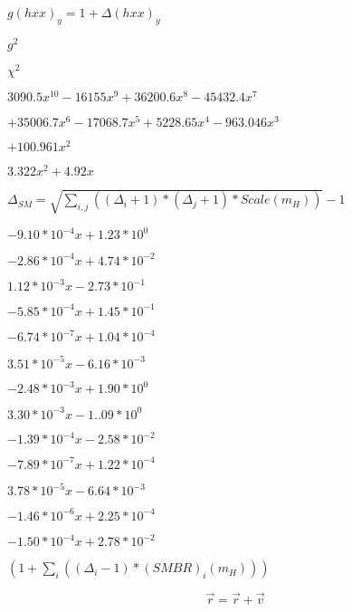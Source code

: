 \documentclass{article}
\begin{document}
$ g(hxx)_y = 1+\Delta(hxx)_y $
\pagebreak

$ g^2 $
\pagebreak

$ \chi^{2}$
\pagebreak

$3090.5x^{10} - 16155x^{9} + 36200.6x^{8} - 45432.4x^{7}$
\pagebreak

$+ 35006.7x^{6} - 17068.7x^{5} + 5228.65x^{4} - 963.046x^{3}$
\pagebreak

$+ 100.961x^{2}$
\pagebreak

$3.322x^{2} + 4.92x$
\pagebreak

$\Delta_{SM}=\sqrt{\sum_{i,j}((\Delta_i+1)*(\Delta_j+1)*Scale(m_H))}-1$
\pagebreak

$-9.10*10^{-4}x + 1.23*10^{0}$
\pagebreak

$-2.86*10^{-4}x + 4.74*10^{-2}$
\pagebreak

$1.12*10^{-3}x - 2.73*10^{-1}$
\pagebreak

$-5.85*10^{-4}x + 1.45*10^{-1}$
\pagebreak

$-6.74*10^{-7}x + 1.04*10^{-4}$
\pagebreak

$3.51*10^{-5}x - 6.16*10^{-3}$
\pagebreak

$-2.48*10^{-3}x + 1.90*10^{0}$
\pagebreak

$3.30*10^{-3}x - 1..09*10^{0}$
\pagebreak

$-1.39*10^{-4}x - 2.58*10^{-2}$
\pagebreak

$-7.89*10^{-7}x + 1.22*10^{-4}$
\pagebreak

$3.78*10^{-5}x - 6.64*10^{-3}$
\pagebreak

$-1.46*10^{-6}x + 2.25*10^{-4}$
\pagebreak

$-1.50*10^{-4}x + 2.78*10^{-2}$
\pagebreak

$(1+\sum_i((\Delta_i-1)*(SMBR)_i(m_H)))$
\pagebreak

\[ \vec{r} = \vec{r} + \vec{v} \]
\pagebreak
\end{document}
